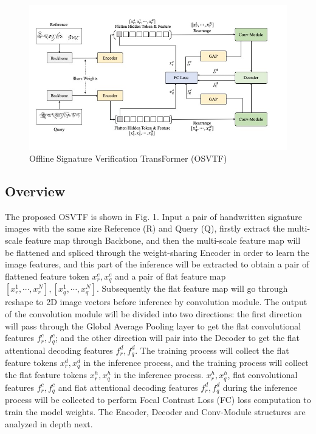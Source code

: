 \documentclass{article}
\begin{document}
\begin{figure}[htbp]
	\centering
	\includegraphics[scale=0.5]{figure/p1.jpg}
	\caption{Offline Signature Verification TransFormer (OSVTF)}\label{fig:p1}
\end{figure}

\subsection{Overview}

The proposed OSVTF is shown in Fig. 1. Input a pair of handwritten signature images with the same size Reference (R) and Query (Q), firstly extract the multi-scale feature map through Backbone, and then the multi-scale feature map will be flattened and spliced through the weight-sharing Encoder in order to learn the image features, and this part of the inference will be extracted to obtain a pair of flattened feature token $x_r^e,x_q^e$ and a pair of flat feature map $[x_r^1,\cdots,x_r^N],[x_q^1,\cdots,x_q^N]$. Subsequently the flat feature map will go through reshape to 2D image vectors before inference by convolution module. The output of the convolution module will be divided into two directions: the first direction will pass through the Global Average Pooling layer to get the flat convolutional features $f_r^c,f_q^c$; and the other direction will pair into the Decoder to get the flat attentional decoding features $f_r^d,f_q^d$. The training process will collect the flat feature tokens $x_r^d,x_q^d$ in the inference process, and the training process will collect the flat feature tokens $x_r^h,x_q^h$ in the inference process. $x_r^h,x_q^h$, flat convolutional features $f_r^c ,f_q^c$ and flat attentional decoding features $f_r^d,f_q^d$ during the inference process will be collected to perform Focal Contrast Loss (FC) loss computation to train the model weights. The Encoder, Decoder and Conv-Module structures are analyzed in depth next.
\end{document}
